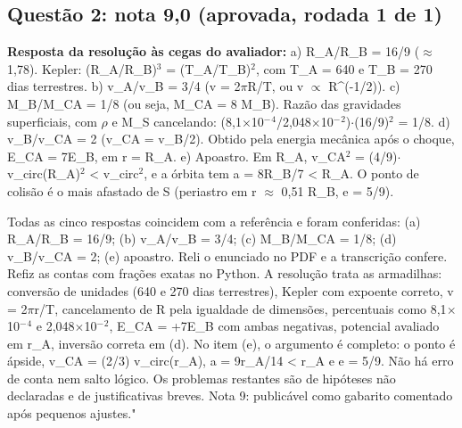 \documentclass{article}%
\begin{document}
\subsection*{Questão 2: nota 9,0 (aprovada, rodada 1 de 1)}%
\textbf{Resposta da resolução às cegas do avaliador:} a) R\_A/R\_B = 16/9 ($\approx$ 1,78). Kepler: (R\_A/R\_B)$^3$ = (T\_A/T\_B)$^2$, com T\_A = 640 e T\_B = 270 dias terrestres.\newline%
b) v\_A/v\_B = 3/4 (v = 2$\pi$R/T, ou v $\propto$ R\^{}(-1/2)).\newline%
c) M\_B/M\_CA = 1/8 (ou seja, M\_CA = 8 M\_B). Razão das gravidades superficiais, com $\rho$ e M\_S cancelando: (8,1$\times$10$^{-}$$^{4}$/2,048$\times$10$^{-}$$^2$)$\cdot$(16/9)$^2$ = 1/8.\newline%
d) v\_B/v\_CA = 2 (v\_CA = v\_B/2). Obtido pela energia mecânica após o choque, E\_CA = 7E\_B, em r = R\_A.\newline%
e) Apoastro. Em R\_A, v\_CA$^2$ = (4/9)$\cdot$v\_circ(R\_A)$^2$ < v\_circ$^2$, e a órbita tem a = 8R\_B/7 < R\_A. O ponto de colisão é o mais afastado de S (periastro em r $\approx$ 0,51 R\_B, e = 5/9).\par %
Todas as cinco respostas coincidem com a referência e foram conferidas: (a) R\_A/R\_B = 16/9; (b) v\_A/v\_B = 3/4; (c) M\_B/M\_CA = 1/8; (d) v\_B/v\_CA = 2; (e) apoastro. Reli o enunciado no PDF e a transcrição confere. Refiz as contas com frações exatas no Python. A resolução trata as armadilhas: conversão de unidades (640 e 270 dias terrestres), Kepler com expoente correto, v = 2$\pi$r/T, cancelamento de R pela igualdade de dimensões, percentuais como 8,1$\times$10$^{-}$$^{4}$ e 2,048$\times$10$^{-}$$^2$, E\_CA = +7E\_B com ambas negativas, potencial avaliado em r\_A, inversão correta em (d). No item (e), o argumento é completo: o ponto é ápside, v\_CA = (2/3) v\_circ(r\_A), a = 9r\_A/14 < r\_A e e = 5/9. Não há erro de conta nem salto lógico. Os problemas restantes são de hipóteses não declaradas e de justificativas breves. Nota 9: publicável como gabarito comentado após pequenos ajustes."%
\end{document}

